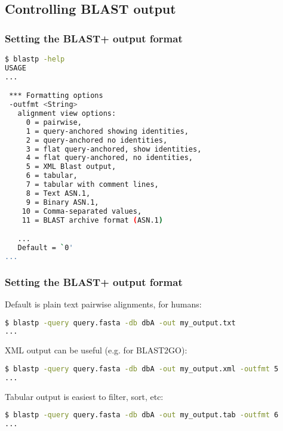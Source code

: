 
\subsection{Controlling BLAST output}
\begin{frame}[fragile]
  \frametitle{Setting the BLAST+ output format}
\begin{lstlisting}[language=sh]
$ blastp -help
USAGE
...

 *** Formatting options
 -outfmt <String>
   alignment view options:
     0 = pairwise,
     1 = query-anchored showing identities,
     2 = query-anchored no identities,
     3 = flat query-anchored, show identities,
     4 = flat query-anchored, no identities,
     5 = XML Blast output,
     6 = tabular,
     7 = tabular with comment lines,
     8 = Text ASN.1,
     9 = Binary ASN.1,
    10 = Comma-separated values,
    11 = BLAST archive format (ASN.1)

   ...
   Default = `0'
...
\end{lstlisting}
\end{frame}

\begin{frame}[fragile]
  \frametitle{Setting the BLAST+ output format}
  Default is plain text pairwise alignments, for humans:
\begin{lstlisting}[language=sh]
$ blastp -query query.fasta -db dbA -out my_output.txt
...
\end{lstlisting}
  XML output can be useful (e.g. for BLAST2GO):
\begin{lstlisting}[language=sh]
$ blastp -query query.fasta -db dbA -out my_output.xml -outfmt 5
...
\end{lstlisting}
  Tabular output is easiest to filter, sort, etc:
\begin{lstlisting}[language=sh]
$ blastp -query query.fasta -db dbA -out my_output.tab -outfmt 6
...
\end{lstlisting}
\end{frame}
